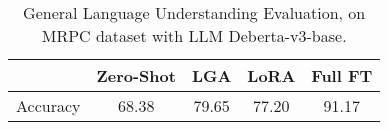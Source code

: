 \begin{table}[h]
\centering
\small
\caption{General Language Understanding Evaluation, on MRPC dataset with LLM Deberta-v3-base.}
\label{tab:GLUE}
\begin{tabular}{@{}lcccc@{}}
\toprule
 & Zero-Shot & LGA & LoRA & Full FT \\ \midrule
Accuracy & 68.38 & 79.65 & 77.20 & 91.17 \\ \bottomrule
\end{tabular}
\end{table}
